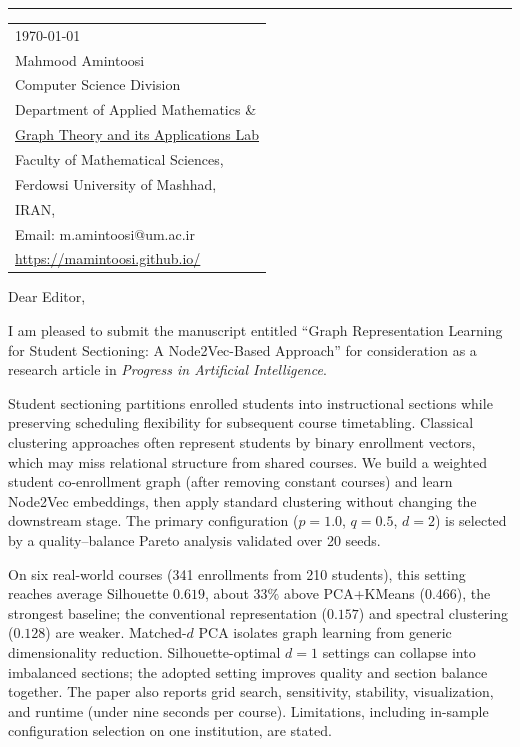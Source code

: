 \documentclass{article}
\begin{document}
\vspace{-1em}
\rule{\linewidth}{1pt}

\bigskip

\hfill
\begin{tabular}{l @{}}
\today \bigskip\\
Mahmood Amintoosi\\
Computer Science Division\\
Department of Applied Mathematics \&\\
\href{https://gta-lab.github.io/}{Graph Theory and its Applications Lab}\\
Faculty of Mathematical Sciences,\\
Ferdowsi University of Mashhad,\\
IRAN,\\
Email: m.amintoosi@um.ac.ir\\
\url{https://mamintoosi.github.io/}
\end{tabular}

\bigskip

Dear Editor,

I am pleased to submit the manuscript entitled ``Graph Representation Learning for Student Sectioning: A Node2Vec-Based Approach'' for consideration as a research article in \textit{Progress in Artificial Intelligence}.

Student sectioning partitions enrolled students into instructional sections while preserving scheduling flexibility for subsequent course timetabling. Classical clustering approaches often represent students by binary enrollment vectors, which may miss relational structure from shared courses. We build a weighted student co-enrollment graph (after removing constant courses) and learn Node2Vec embeddings, then apply standard clustering without changing the downstream stage. The primary configuration ($p=1.0$, $q=0.5$, $d=2$) is selected by a quality--balance Pareto analysis validated over 20 seeds.

On six real-world courses (341 enrollments from 210 students), this setting reaches average Silhouette $0.619$, about $33\%$ above PCA+KMeans ($0.466$), the strongest baseline; the conventional representation ($0.157$) and spectral clustering ($0.128$) are weaker. Matched-$d$ PCA isolates graph learning from generic dimensionality reduction. Silhouette-optimal $d=1$ settings can collapse into imbalanced sections; the adopted setting improves quality and section balance together. The paper also reports grid search, sensitivity, stability, visualization, and runtime (under nine seconds per course). Limitations, including in-sample configuration selection on one institution, are stated.
\end{document}
